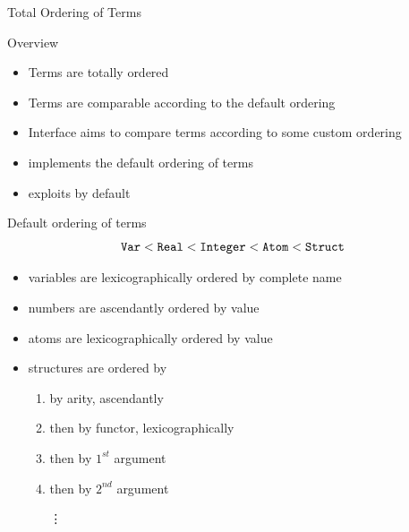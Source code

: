 \documentclass[handout]{beamer}
\begin{document}
\begin{frame}[allowframebreaks]{Total Ordering of Terms}
    \begin{block}{Overview}
        \begin{itemize}
            \item Terms are totally ordered
            \item Terms are comparable according to the default ordering
            \item Interface  aims to compare terms according to some custom ordering
            \item {} implements the default ordering of terms
            \item {} exploits  by default
        \end{itemize}
    \end{block}

    \begin{exampleblock}{Default ordering of terms}
        \[ \texttt{Var} < \texttt{Real} < \texttt{Integer} < \texttt{Atom} < \texttt{Struct} \]
        \begin{itemize}
            \item variables are lexicographically ordered by complete name
            \item numbers are ascendantly ordered by value
            \item atoms are lexicographically ordered by value
            \item structures are ordered by
            \begin{enumerate}
                \item by arity, ascendantly
                \item then by functor, lexicographically
                \item then by $1^{st}$ argument
                \item then by $2^{nd}$ argument
                \item[\vdots]
            \end{enumerate}
        \end{itemize}
    \end{exampleblock}

    \framebreak

\end{frame}
\end{document}
